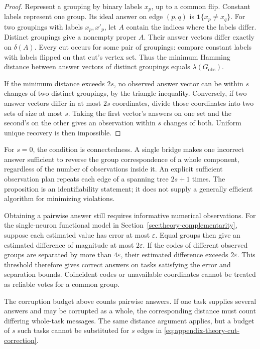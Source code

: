 \begin{proof}
    Represent a grouping by binary labels $x_p$, up to a common
    flip. Constant labels represent one group.
    Its ideal answer on edge $(p,q)$ is
    $\mathbf1\{x_p\ne x_q\}$.
    For two groupings with labels $x_p,x'_p$, let $A$ contain
    the indices where the labels differ. Distinct groupings give
    a nonempty proper $A$. Their answer vectors differ exactly
    on $\delta(A)$.
    Every cut occurs for some pair of groupings: compare constant
    labels with labels flipped on that cut's vertex set.
    Thus the minimum Hamming distance between answer vectors of
    distinct groupings equals $\lambda(G_{\mathrm{obs}})$.

    If the minimum distance exceeds $2s$, no observed answer vector
    can be within $s$ changes of two distinct groupings, by the
    triangle inequality.
    Conversely, if two answer vectors differ in at most $2s$
    coordinates, divide those coordinates into two sets of size
    at most $s$. Taking the first vector's answers on one set
    and the second's on the other gives an observation within
    $s$ changes of both. Uniform unique recovery is then impossible.
\end{proof}

For $s=0$, the condition is connectedness. A single bridge makes
one incorrect answer sufficient to reverse the group correspondence
of a whole component, regardless of the number of observations
inside it. An explicit sufficient observation plan repeats each
edge of a spanning tree $2s+1$ times. The proposition is an
identifiability statement; it does not supply a generally efficient
algorithm for minimizing violations.

Obtaining a pairwise answer still requires informative numerical
observations. For the single-neuron functional model in
Section~\ref{sec:theory-complementarity}, suppose each estimated
value has error at most $\varepsilon$. Equal groups then give
an estimated difference of magnitude at most $2\varepsilon$.
If the codes of different observed groups are separated by
more than $4\varepsilon$, their estimated difference exceeds
$2\varepsilon$. This threshold therefore gives correct answers
on tasks satisfying the error and separation bounds.
Coincident codes or unavailable coordinates cannot be treated
as reliable votes for a common group.

The corruption budget above counts pairwise answers.
If one task supplies several answers and may be corrupted as a
whole, the corresponding distance must count differing whole-task
messages. The same distance argument applies, but a budget of
$s$ such tasks cannot be substituted for $s$ edges in
\eqref{eq:appendix-theory-cut-correction}.

